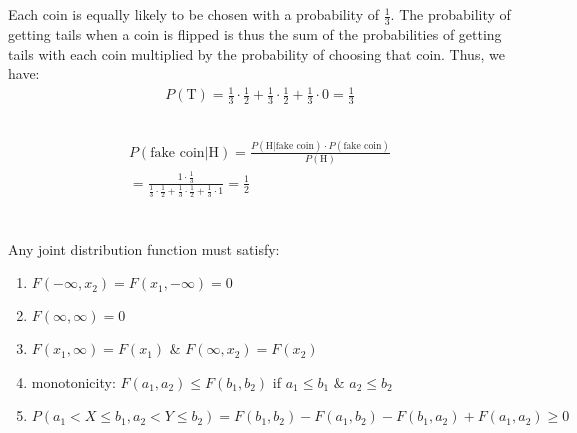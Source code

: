 \documentclass[11pt,a4paper,margin=1in]{article}
\begin{document}
\section{}
    \subsection{}
        Each coin is equally likely to be chosen with a probability of $\frac{1}{3}$.
        The probability of getting tails when a coin is flipped is thus the sum
        of the probabilities of getting tails with each coin multiplied by the probability
        of choosing that coin. Thus, we have:
        \begin{gather*}
            P(\text{T}) = \frac{1}{3} \cdot \frac{1}{2} + \frac{1}{3} \cdot \frac{1}{2} + \frac{1}{3} \cdot 0 = \frac{1}{3}
        \end{gather*}
    \subsection{}
        \begin{gather*}
            P(\text{fake coin} | \text{H}) = \frac{P(\text{H} | \text{fake coin}) \cdot P(\text{fake coin})}{P(\text{H})}\\
            = \frac{1 \cdot \frac{1}{3}}{\frac{1}{3} \cdot \frac{1}{2} + \frac{1}{3} \cdot \frac{1}{2} + \frac{1}{3} \cdot 1} = \frac{1}{2}
        \end{gather*}

\section{}
    Any joint distribution function must satisfy:
    \begin{enumerate}[1.]
        \item $F(-\infty, x_2) = F(x_1, -\infty) = 0$
        \item $F(\infty, \infty) = 0$
        \item $F(x_1, \infty) = F(x_1)$ \& $F(\infty, x_2) = F(x_2)$
        \item monotonicity: $F(a_1, a_2) \leq F(b_1, b_2)$ if $a_1 \leq b_1$ \& $a_2 \leq b_2$
        \item $P(a_1 < X \leq b_1, a_2 < Y \leq b_2) = F(b_1, b_2) - F(a_1, b_2) - F(b_1, a_2) + F(a_1, a_2) \geq 0$
    \end{enumerate}
\end{document}
